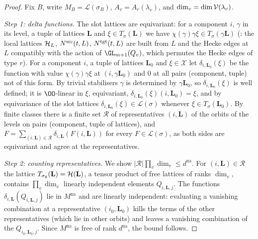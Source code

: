 \begin{proof}
Fix $B$, write $M_B=\mathcal L(\sigma_B)$, $A_v=A_r(\lambda_v)$, and $\dim_v=\dim\mathcal V(\lambda_v)$.

\emph{Step 1: delta functions.} The slot lattices are equivariant: for a component $i$, $\gamma$ in its level, a tuple of
lattices $\mathbf L$ and $\xi\in T_\sigma(\mathbf L)$ we have $\chi(\gamma)\gamma\xi\in T_\sigma(\gamma\mathbf L)$
(: the local lattices $\mathcal H_L$, $N^{\mathrm{src}}(t,L)$, $N^{\mathrm{tgt}}(t,L)$ are
built from $L$ and the Hecke edges at $L$ compatibly with the action of $\GL_{m+1}(Q_v)$, which permutes the Hecke edges of
type $r$). For a component $i$, a tuple of lattices $\mathbf L_0$ and $\xi\in\mathcal X$ let $\delta_{i,\mathbf L_0}(\xi)$ be the
function with value $\chi(\gamma)\gamma\xi$ at $(i,\gamma\mathbf L_0)$ and $0$ at all pairs (component, tuple) not of this
form. By trivial stabilisers $\gamma$ is determined by $\gamma\mathbf L_0$, so $\delta_{i,\mathbf L_0}(\xi)$ is well defined; it
is $\OO$-linear in $\xi$, equivariant, $\delta_{i,\mathbf L_0}(\xi)(i,\mathbf L_0)=\xi$, and by equivariance of the slot lattices
$\delta_{i,\mathbf L_0}(\xi)\in\mathcal L(\sigma)$ whenever $\xi\in T_\sigma(\mathbf L_0)$. By finite classes there is a finite set
$\mathcal R$ of representatives $(i,\mathbf L)$ of the orbits of the levels on pairs (component, tuple of lattices), and
$F=\sum_{(i,\mathbf L)\in\mathcal R}\delta_{i,\mathbf L}(F(i,\mathbf L))$ for every $F\in\mathcal L(\sigma)$, as both sides are
equivariant and agree at the representatives.

\emph{Step 2: counting representatives.} We show $|\mathcal R|\prod_v\dim_v\le d^{\mathrm{na}}$. For $(i,\mathbf L)\in\mathcal R$
the lattice $T_{\sigma_\emptyset}(\mathbf L)=\mathcal H(\mathbf L)$, a tensor product of free lattices of ranks $\dim_v$, contains
$\prod_v\dim_v$ linearly independent elements $Q_{i,\mathbf L,j}$. The functions $\delta_{i,\mathbf L}(Q_{i,\mathbf L,j})$ lie in
$M^{\mathrm{na}}$ and are linearly independent: evaluating a vanishing combination at a representative $(i_0,\mathbf L_0)$ kills
the terms of the other representatives (which lie in other orbits) and leaves a vanishing combination of the
$Q_{i_0,\mathbf L_0,j}$. Since $M^{\mathrm{na}}$ is free of rank $d^{\mathrm{na}}$, the bound follows.


\end{proof}
